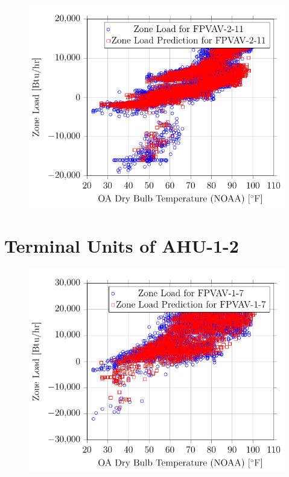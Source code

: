 \begin{figure}
\centering
\includegraphics[]{Plots/21/2017-06-27-1334-BtuhrvsOADryBulbTemperatureNOAAF.pdf}
\caption{}
\label{fig:2017-06-27-1334-BtuhrvsOADryBulbTemperatureNOAAF}
\end{figure}

\section{Terminal Units of AHU-1-2}

\begin{figure}
    \centering
    \includegraphics[]{Plots/22/2017-06-27-1343-BtuhrvsOADryBulbTemperatureNOAAF.pdf}
    \caption{}
    \label{fig:2017-06-27-1343-BtuhrvsOADryBulbTemperatureNOAAF}
\end{figure}

